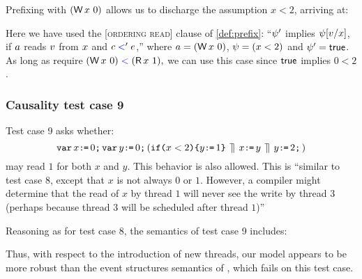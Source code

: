 Prefixing with $(\DW{x}{0})$ allows us to discharge the assumption $x<2$,
arriving at:
\begin{tikzdisplay}[node distance=1em,baselinecenter]
  \end{tikzdisplay}
Here we have used the \textsc{[ordering read]}
clause of \ref{def:prefix}:
``$\psi'$ implies $\psi[v/x]$, if $a$ reads $v$ from $x$ and $c\mathrel{{\color{blue}<}}'e$,''
where $a=(\DW{x}{0})$,  $\psi=(x<2)$ and $\psi'=\mathsf{true}$.  As long as
require
\begin{math}
  (\DW{x}{0})\lt
  (\DR{x}{1}),
\end{math}
we can use this case since $\mathsf{true}$ implies $0<2$.

\subsubsection{Causality test case 9}

Test case 9 asks whether:
\begin{displaymath}
  \texttt{var}\, x\texttt{:}\mkern-1mu\texttt{=}\, 0\texttt{;}\,
  \texttt{var}\, y\texttt{:}\mkern-1mu\texttt{=}\, 0\texttt{;}\,
  (\texttt{if}\allowbreak\texttt{(}x<2\texttt{)}\allowbreak\texttt{\{} y\texttt{:}\mkern-1mu\texttt{=}\, 1\texttt{\}} 
  \,\mathbin{\rrceil}\,
  x\texttt{:}\mkern-1mu\texttt{=}\, y
  \,\mathbin{\rrceil}\,
  y\texttt{:}\mkern-1mu\texttt{=}\, 2\texttt{;}\,)
\end{displaymath}
may read $1$ for both $x$ and $y$.  This behavior is also allowed.  This is
``similar to test case $8$, except that $x$ is not always $0$ or
$1$. However, a compiler might determine that the read of $x$ by thread $1$
will never see the write by thread $3$ (perhaps because thread $3$ will be
scheduled after thread $1$)''

Reasoning as for test case 8, the semantics of test case 9 includes:
\begin{tikzdisplay}[node distance=1em]
\end{tikzdisplay}

Thus, with respect to the introduction of new threads, our model appears to
be more robust than the event structures semantics of
\cite{DBLP:conf/lics/JeffreyR16}, which fails on this test case.

